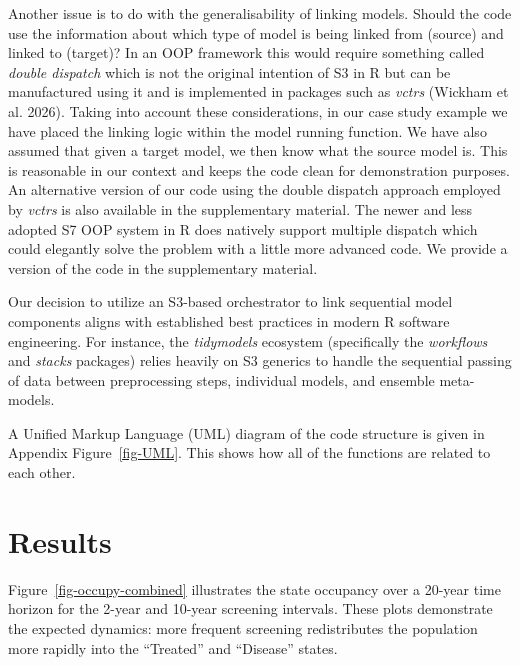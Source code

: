 \documentclass[
]{article}
\begin{document}
Another issue is to do with the generalisability of linking models.
Should the code use the information about which type of model is being
linked from (source) and linked to (target)? In an OOP framework this
would require something called \emph{double dispatch} which is not the
original intention of S3 in R but can be manufactured using it and is
implemented in packages such as \emph{vctrs} (Wickham et al. 2026).
Taking into account these considerations, in our case study example we
have placed the linking logic within the model running function. We have
also assumed that given a target model, we then know what the source
model is. This is reasonable in our context and keeps the code clean for
demonstration purposes. An alternative version of our code using the
double dispatch approach employed by \emph{vctrs} is also available in
the supplementary material. The newer and less adopted S7 OOP system in
R does natively support multiple dispatch which could elegantly solve
the problem with a little more advanced code. We provide a version of
the code in the supplementary material.

Our decision to utilize an S3-based orchestrator to link sequential
model components aligns with established best practices in modern R
software engineering. For instance, the \emph{tidymodels} ecosystem
(specifically the \emph{workflows} and \emph{stacks} packages) relies
heavily on S3 generics to handle the sequential passing of data between
preprocessing steps, individual models, and ensemble meta-models.

A Unified Markup Language (UML) diagram of the code structure is given
in Appendix Figure~\ref{fig-UML}. This shows how all of the functions
are related to each other.

\section{Results}\label{results}

Figure~\ref{fig-occupy-combined} illustrates the state occupancy over a
20-year time horizon for the 2-year and 10-year screening intervals.
These plots demonstrate the expected dynamics: more frequent screening
redistributes the population more rapidly into the ``Treated'' and
``Disease'' states.
\end{document}
